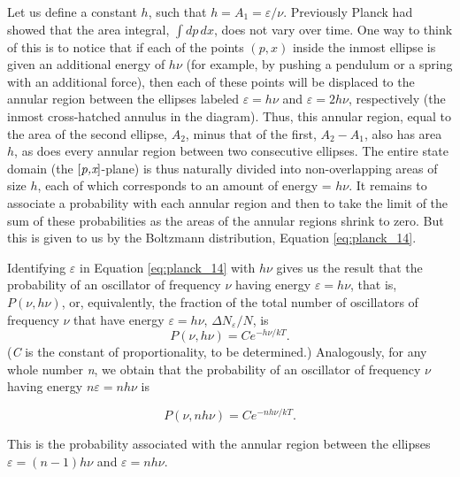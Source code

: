 %
Let us define a constant $h$, such that $h = A_1 = \varepsilon/\nu$. Previously Planck had showed that the area integral,
$\int\! dp\, dx$, does not vary over time. One way to think of this is to
notice that if each of the points $(p,x)$ inside the inmost ellipse
is given an additional energy of $h\nu$ (for example, by pushing a
pendulum or a spring with an additional force), then each of these
points will be displaced to the annular region between the ellipses
labeled $\varepsilon = h\nu$ and $\varepsilon = 2h\nu$, respectively (the inmost
cross-hatched annulus in the diagram). Thus, this annular region, equal
to the area of the second ellipse, $A_2$, minus that
of the first, $A_2 - A_1$,
also has area $h$, as does every annular region between two
consecutive ellipses. The entire state domain (the
${[}\emph{p,x}{]}$-plane) is thus naturally divided into non-overlapping
areas of size $h$, each of which corresponds to an amount of energy
= $h\nu$. It remains to associate a probability with each annular
region and then to take the limit of the sum of these probabilities as
the areas of the annular regions shrink to zero. But this is given to us
by the Boltzmann distribution, Equation \eqref{eq:planck_14}.

Identifying $\varepsilon$ in Equation \eqref{eq:planck_14} with $h\nu$ gives us the result
that the probability of an oscillator of frequency $\nu$ having
energy $\varepsilon = h\nu$, that is, $P(\nu, h\nu)$, or, equivalently, the
fraction of the total number of oscillators of frequency $\nu$ that
have energy $\varepsilon = h\nu$, $\Delta N_\varepsilon/N$,
is
%
\begin{equation*}
P(\nu, h\nu) = Ce^{-h\nu/kT}.
\end{equation*}
%
(\emph{C} is the constant of proportionality, to be determined.)
Analogously, for any whole number \emph{n}, we obtain that the
probability of an oscillator of frequency $\nu$ having energy
$n\varepsilon = nh\nu$ is

\begin{equation}
P(\nu, nh\nu) = Ce^{-nh\nu/kT}. %
\end{equation}

This is the probability associated with the annular region between the
ellipses $\varepsilon = (n-1)h\nu$ and $\varepsilon = nh\nu$.

